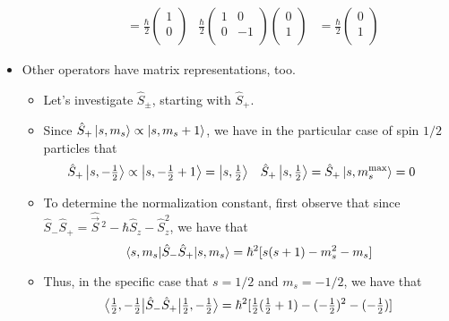 \documentclass[../notes.tex]{subfiles}
\begin{document}
\begin{itemize}
\begin{itemize}
\begin{align*}
            &= \frac{\hbar}{2}
            \begin{pmatrix}
                1\\
                0\\
            \end{pmatrix}&
            \frac{\hbar}{2}
            \begin{pmatrix}
                1 & 0\\
                0 & -1\\
            \end{pmatrix}
            \begin{pmatrix}
                0\\
                1\\
            \end{pmatrix}
            &= \frac{\hbar}{2}
            \begin{pmatrix}
                0\\
                1\\
            \end{pmatrix}
        \end{align*}
    \end{itemize}
    \item Other operators have matrix representations, too.
    \begin{itemize}
        \item Let's investigate $\hat{S}_\pm$, starting with $\hat{S}_+$.
        \item Since $\hat{S}_+\ket{s,m_s}\propto\ket{s,m_s+1}$, we have in the particular case of spin $1/2$ particles that
        \begin{align*}
            \hat{S}_+\ket{s,-\tfrac{1}{2}} &\propto \ket{s,-\tfrac{1}{2}+1} = \ket{s,\tfrac{1}{2}}&
            \hat{S}_+\ket{s,\tfrac{1}{2}} &= \hat{S}_+\ket{s,m_s^\text{max}} = 0
        \end{align*}
        \item To determine the normalization constant, first observe that since $\hat{S}_-\hat{S}_+=\hat{\vec{S}}{\,}^2-\hbar\hat{S}_z-\hat{S}_z^2$, we have that
        \begin{equation*}
            \ev{\hat{S}_-\hat{S}_+}{s,m_s} = \hbar^2[s(s+1)-m_s^2-m_s]
        \end{equation*}
        \item Thus, in the specific case that $s=1/2$ and $m_s=-1/2$, we have that 
        \begin{equation*}
            \ev{\hat{S}_-\hat{S}_+}{\tfrac{1}{2},-\tfrac{1}{2}} = \hbar^2[\tfrac{1}{2}(\tfrac{1}{2}+1)-(-\tfrac{1}{2})^2-(-\tfrac{1}{2})]

\end{equation*}
\end{itemize}
\end{itemize}
\end{document}
